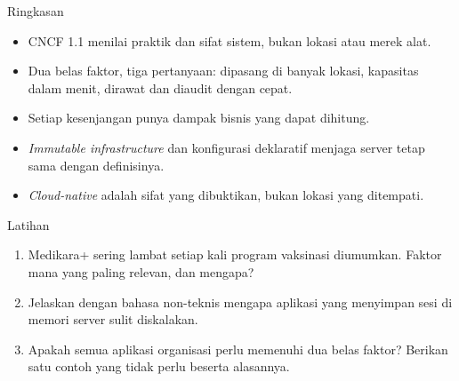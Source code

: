 \documentclass[aspectratio=169, table, 12pt]{beamer}
\begin{document}
\begin{frame}{{\Large Ringkasan}}
  \vspace{10pt}
  \begin{itemize}
    \item CNCF 1.1 menilai praktik dan sifat sistem, bukan lokasi atau merek alat.
    \item Dua belas faktor, tiga pertanyaan: dipasang di banyak lokasi, kapasitas
          dalam menit, dirawat dan diaudit dengan cepat.
    \item Setiap kesenjangan punya dampak bisnis yang dapat dihitung.
    \item \textit{Immutable infrastructure} dan konfigurasi deklaratif menjaga
          server tetap sama dengan definisinya.
    \item \textit{Cloud-native} adalah sifat yang dibuktikan, bukan lokasi yang
          ditempati.
  \end{itemize}
\end{frame}

\begin{frame}{{\Large Latihan}}
  \vspace{10pt}
  \begin{enumerate}
    \item Medikara+ sering lambat setiap kali program vaksinasi diumumkan. Faktor
          mana yang paling relevan, dan mengapa?
    \item Jelaskan dengan bahasa non-teknis mengapa aplikasi yang menyimpan sesi
          di memori server sulit diskalakan.
    \item Apakah semua aplikasi organisasi perlu memenuhi dua belas faktor?
          Berikan satu contoh yang tidak perlu beserta alasannya.
  \end{enumerate}
\end{frame}
\end{document}
